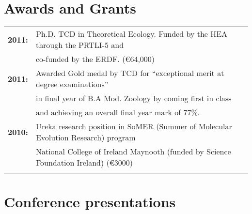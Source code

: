 \documentclass[10pt,a4paper]{article}
\begin{document}

\section{Awards and Grants}

\begin{tabular}{ll}
\textbf{2011:} & Ph.D. TCD in Theoretical Ecology. Funded by the HEA through the PRTLI-5 and\\
& co-funded by the ERDF. (\euro 64,000)\\
\textbf{2011:} & Awarded Gold medal by TCD for “exceptional merit at degree examinations”\\
& in final year of B.A Mod. Zoology by coming first in class\\
& and achieving an overall final year mark of 77\%.\\
\textbf{2010:} & Ureka research position in SoMER (Summer of Molecular Evolution Research) program\\
& National College of Ireland Maynooth (funded by Science Foundation Ireland) (\euro 3000)\\
& \\ 
\end{tabular}

\bigskip

\section{Conference presentations}
\end{document}
